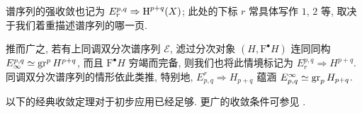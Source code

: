 \begin{convention}\label{con:ss-conv}
	谱序列的强收敛也记为 $E_r^{p,q} \Rightarrow \operatorname{H}^{p+q} (X)$; 此处的下标 $r$ 常具体写作 $1$, $2$ 等, 取决于我们着重描述谱序列的哪一页.
	
	推而广之, 若有上同调双分次谱序列 $\mathscr{E}$, 滤过分次对象 $(H, \mathrm{F}^\bullet H)$ 连同同构 $E_\infty^{p,q} \simeq \operatorname{gr}^p H^{p+q}$, 而且 $\mathrm{F}^\bullet H$ 穷竭而完备, 则我们也将此情境标记为 $E_r^{p, q} \Rightarrow H^{p+q}$. 同调双分次谱序列的情形依此类推, 特别地, $E^r_{p, q} \Rightarrow H_{p+q}$ 蕴涵 $E^\infty_{p,q} \simeq \operatorname{gr}_p H_{p+q}$.
\end{convention}

以下的经典收敛定理对于初步应用已经足够. 更广的收敛条件可参见 \cite{Boa99}.

